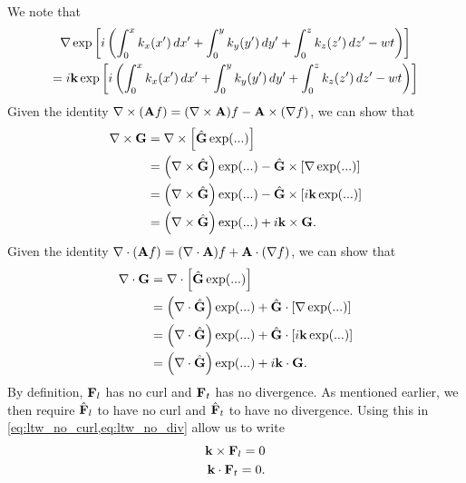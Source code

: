 \documentclass[a4paper,11pt]{report}
\begin{document}
We note that
\begin{multline}
    \nabla \exp \left [ i \left ( \int_0^x k_x(x') \, dx' + \int_0^y k_y(y') \, dy' + \int_0^z k_z(z') \, dz'  - wt \right ) \right ] \\
    = i \mathbf{k} \exp \left [ i \left ( \int_0^x k_x(x') \, dx' + \int_0^y k_y(y') \, dy' + \int_0^z k_z(z') \, dz'  - wt \right ) \right ]
\end{multline}
Given the identity $\nabla \times (\mathbf{A} f) = (\nabla \times \mathbf{A} ) f - \mathbf{A} \times (\nabla f)$, we can show that
\begin{align}
    \label{eq:ltw_no_curl}
    \nabla \times \mathbf{G} &= \nabla \times \left [ \hat{\mathbf{G}} \exp (...) \right ] \nonumber \\
    &= \left ( \nabla \times \hat{\mathbf{G}} \right ) \exp (...) - \hat{\mathbf{G}} \times \left [ \nabla \exp (...) \right ] \nonumber \\
    &= \left ( \nabla \times \hat{\mathbf{G}} \right ) \exp (...) - \hat{\mathbf{G}} \times \left [ i\mathbf{k} \exp (...) \right ] \nonumber \\
    &= \left ( \nabla \times \hat{\mathbf{G}} \right ) \exp (...) + i \mathbf{k} \times \mathbf{G}.
\end{align}
Given the identity $\nabla \cdot (\mathbf{A} f) = ( \nabla \cdot \mathbf{A}) f + \mathbf{A} \cdot (\nabla f)$, we can show that
\begin{align}
    \label{eq:ltw_no_div}
    \nabla \cdot \mathbf{G} &= \nabla \cdot \left [ \hat{\mathbf{G}} \exp (...) \right ] \nonumber \\
    &= \left ( \nabla \cdot \hat{\mathbf{G}} \right ) \exp (...) + \hat{\mathbf{G}} \cdot \left [ \nabla \exp (...) \right ] \nonumber \\
    &= \left ( \nabla \cdot \hat{\mathbf{G}} \right ) \exp (...) + \hat{\mathbf{G}} \cdot \left [ i \mathbf{k} \exp (...) \right ] \nonumber \\
    &= \left ( \nabla \cdot \hat{\mathbf{G}} \right ) \exp (...) + i \mathbf{k} \cdot \mathbf{G}.
\end{align}
By definition, $\mathbf{F}_l$ has no curl and $\mathbf{F}_t$ has no divergence. As mentioned earlier, we then require $\hat{\mathbf{F}}_l$ to have no curl and $\hat{\mathbf{F}}_t$ to have no divergence. Using this in \cref{eq:ltw_no_curl,eq:ltw_no_div} allow us to write
\begin{align}
    \mathbf{k} \times \mathbf{F}_l = 0 \label{eq:ltw_plasma_long_wavevector} \\
    \mathbf{k} \cdot \mathbf{F}_t = 0 \label{eq:ltw_plasma_trans_wavevector}.
\end{align}
\end{document}
